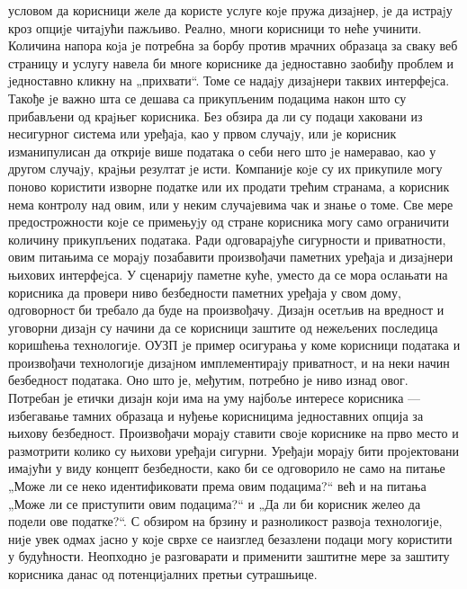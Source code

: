 \documentclass[a4paper]{article}
\begin{document}
условом да корисници желе да користе услуге коjе пружа дизаjнер, jе да истраjу кроз опциjе читаjући пажљиво. Реално, многи корисници то неће учинити. Количина напора коjа jе потребна за борбу против
мрачних образаца за сваку веб страницу и услугу навела би многе кориснике да jедноставно заобиђу проблем и jедноставно кликну на „прихвати“. Томе се надаjу дизаjнери таквих интерфеjса.
\newline  \newline
Такође jе важно шта се дешава са прикупљеним подацима након што су прибављени од краjњег корисника. Без обзира да ли су подаци хаковани из несигурног система или уређаjа, као у првом случаjу, или jе
корисник изманипулисан да открије више података о себи него што jе намеравао, као у другом случаjу, краjњи резултат jе исти. Компаниjе коjе су их прикупиле могу поново користити изворне податке или их
продати трећим странама, а корисник нема контролу над овим, или у неким случаjевима чак и знање о томе. Све мере предострожности коjе се примењуjу од стране корисника могу само ограничити количину
прикупљених података. Ради одговараjуће сигурности и приватности, овим питањима се мораjу позабавити произвођачи паметних уређаjа и дизаjнери њихових интерфеjса.
\newline  \newline
У сценарију паметне куће, уместо да се мора ослањати на корисника да провери ниво безбедности паметних уређаја у свом дому, одговорност би требало да буде на произвођачу.
Дизаjн осетљив на вредност \cite{6} и уговорни дизаjн \cite{7} су начини да се корисници заштите од нежељених последица коришћења технологиjе. ОУЗП jе пример осигурања
у коме корисници података и произвођачи технологиjе дизаjном имплементираjу приватност, и на неки начин безбедност података. Оно што је, међутим,
потребно је ниво изнад овог. Потребан је етички дизајн који има на уму најбоље интересе корисника — избегавање тамних образаца и нуђење корисницима једноставних опција за
њихову безбедност.
\newline  \newline
Произвођачи мораjу ставити своjе кориснике на прво место и размотрити колико су њихови уређаjи сигурни. Уређаjи мораjу бити проjектовани имаjући у виду концепт
безбедности, како би се одговорило не само на питање „Може ли се неко идентификовати према овим подацима?“ већ и на питања „Може ли се приступити овим подацима?“ и „Да ли
би корисник желео да подели ове податке?“. С обзиром на брзину и разноликост развоjа технологиjе, ниjе увек одмах jасно у коjе сврхе се наизглед безазлени
подаци могу користити у будућности. Неопходно jе разговарати и применити заштитне мере за заштиту корисника данас од потенциjалних претњи сутрашњице.
\end{document}
